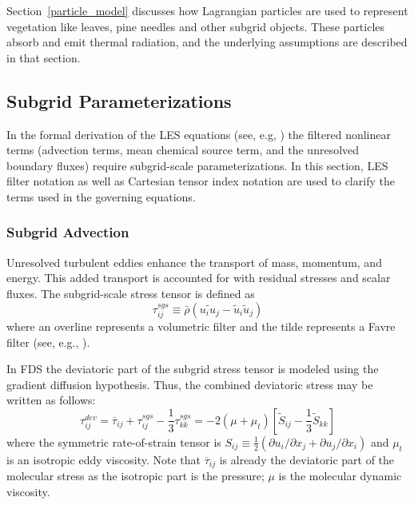 \documentclass[journal,article,atmosphere,submit,moreauthors,pdftex]{Definitions_Review_Process/mdpi}
\begin{document}
Section~\ref{particle_model} discusses how Lagrangian particles are used to represent vegetation like leaves, pine needles and other subgrid objects. These particles absorb and emit thermal radiation, and the underlying assumptions are described in that section.

\subsection{Subgrid Parameterizations} \label{sec:subgrid}

In the formal derivation of the LES equations (see, e.g, \cite{Pope:2000,FDS_Math_Guide}) the filtered nonlinear terms (advection terms, mean chemical source term, and the unresolved boundary fluxes) require subgrid-scale parameterizations.  In this section, LES filter notation as well as Cartesian tensor index notation are used to clarify the terms used in the governing equations.

\subsubsection{Subgrid Advection}

Unresolved turbulent eddies enhance the transport of mass, momentum, and energy.  This added transport is accounted for with residual stresses and scalar fluxes.  The subgrid-scale stress tensor is defined as
\begin{equation}
\tau_{ij}^{sgs} \equiv \bar{\rho}(\widetilde{u_i u_j} - \tilde{u}_i \tilde{u}_j)
\end{equation}
where an overline represents a volumetric filter and the tilde represents a Favre filter (see, e.g., \cite{Poinsot:TNC}).

In FDS the deviatoric part of the subgrid stress tensor is modeled using the gradient diffusion hypothesis.  Thus, the combined deviatoric stress may be written as follows:
\begin{equation}
\tau_{ij}^{dev} = \overline{\tau}_{ij} + \tau_{ij}^{sgs} - \frac{1}{3} \tau_{kk}^{sgs} = -2 (\mu + \mu_t) \left[ \tilde{S}_{ij} - \frac{1}{3} \tilde{S}_{kk} \right]
\end{equation}
where the symmetric rate-of-strain tensor is $S_{ij} \equiv \frac{1}{2}(\partial u_i/\partial x_j + \partial u_j/\partial x_i)$ and $\mu_t$ is an isotropic eddy viscosity.  Note that $\overline{\tau}_{ij}$ is already the deviatoric part of the molecular stress as the isotropic part is the pressure; $\mu$ is the molecular dynamic viscosity.
\end{document}
